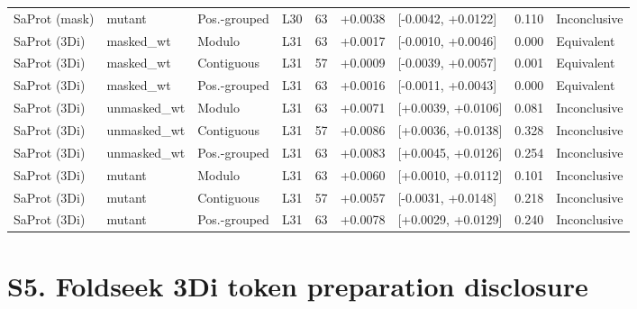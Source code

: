 \documentclass[11pt,a4paper]{article}
\begin{document}
\begin{table}[H]
{\begin{tabular}{lllrrllll}
SaProt (mask) & mutant & Pos.-grouped & L30 & 63 & +0.0038 & [-0.0042, +0.0122] & 0.110 & Inconclusive \\
SaProt (3Di) & masked\_wt & Modulo & L31 & 63 & +0.0017 & [-0.0010, +0.0046] & 0.000 & Equivalent \\
SaProt (3Di) & masked\_wt & Contiguous & L31 & 57 & +0.0009 & [-0.0039, +0.0057] & 0.001 & Equivalent \\
SaProt (3Di) & masked\_wt & Pos.-grouped & L31 & 63 & +0.0016 & [-0.0011, +0.0043] & 0.000 & Equivalent \\
SaProt (3Di) & unmasked\_wt & Modulo & L31 & 63 & +0.0071 & [+0.0039, +0.0106] & 0.081 & Inconclusive \\
SaProt (3Di) & unmasked\_wt & Contiguous & L31 & 57 & +0.0086 & [+0.0036, +0.0138] & 0.328 & Inconclusive \\
SaProt (3Di) & unmasked\_wt & Pos.-grouped & L31 & 63 & +0.0083 & [+0.0045, +0.0126] & 0.254 & Inconclusive \\
SaProt (3Di) & mutant & Modulo & L31 & 63 & +0.0060 & [+0.0010, +0.0112] & 0.101 & Inconclusive \\
SaProt (3Di) & mutant & Contiguous & L31 & 57 & +0.0057 & [-0.0031, +0.0148] & 0.218 & Inconclusive \\
SaProt (3Di) & mutant & Pos.-grouped & L31 & 63 & +0.0078 & [+0.0029, +0.0129] & 0.240 & Inconclusive \\
\bottomrule
\end{tabular}}
\end{table}

\section*{S5. Foldseek 3Di token preparation disclosure}
\end{document}
